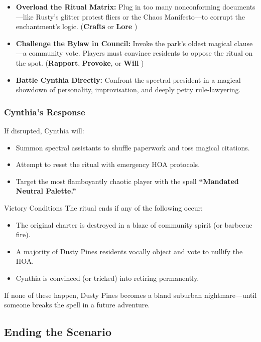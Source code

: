 \begin{multicols}{2}
\begin{itemize}
    \item \textbf{Overload the Ritual Matrix:} Plug in too many nonconforming documents—like Rusty’s glitter protest fliers or the Chaos Manifesto—to corrupt the enchantment's logic. (\textbf{Crafts} or \textbf{Lore} )
    \item \textbf{Challenge the Bylaw in Council:} Invoke the park’s oldest magical clause—a community vote. Players must convince residents to oppose the ritual on the spot. (\textbf{Rapport}, \textbf{Provoke}, or \textbf{Will} )
    \item \textbf{Battle Cynthia Directly:} Confront the spectral president in a magical showdown of personality, improvisation, and deeply petty rule-lawyering.
\end{itemize}

\subsubsection*{Cynthia's Response}
If disrupted, Cynthia will:
\begin{itemize}
    \item Summon spectral assistants to shuffle paperwork and toss magical citations.
    \item Attempt to reset the ritual with emergency HOA protocols.
    \item Target the most flamboyantly chaotic player with the spell \textbf{“Mandated Neutral Palette.”}
\end{itemize}

\begin{CommentBox}{Victory Conditions}
    The ritual ends if any of the following occur:
    \begin{itemize}
        \item The original charter is destroyed in a blaze of community spirit (or barbecue fire).
        \item A majority of Dusty Pines residents vocally object and vote to nullify the HOA.
        \item Cynthia is convinced (or tricked) into retiring permanently.
    \end{itemize}
    If none of these happen, Dusty Pines becomes a bland suburban nightmare—until someone breaks the spell in a future adventure.
\end{CommentBox}


\subsection{Ending the Scenario}


\end{multicols}
